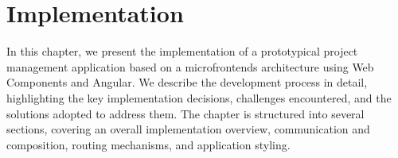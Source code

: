 \chapter{Implementation}
\label{chap:Implementation}
In this chapter, we present the implementation of a prototypical project management application based on a microfrontends architecture using Web Components and Angular. We describe the development process in detail, highlighting the key implementation decisions, challenges encountered, and the solutions adopted to address them. The chapter is structured into several sections, covering an overall implementation overview, communication and composition, routing mechanisms, and application styling.





